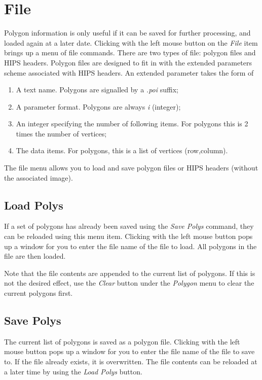 \section{File}
Polygon information is only useful if it can be saved for further processing, and loaded again at a later date. Clicking with the left mouse button on the {\it File\/} item brings up a menu of file commands. There are two types of file: polygon files and HIPS headers. Polygon files are designed to fit in with the extended parameters scheme associated with HIPS headers. An extended parameter takes the form of 
\begin{enumerate}
\item A text name. Polygons are signalled by a {\it .poi\/} suffix;
\item A parameter format. Polygons are always {\it i\/} (integer);
\item An integer specifying the number of following items. For polygons this is 2 times the number of vertices;
\item The data items. For polygons, this is a list of vertices (row,column).
\end{enumerate}
The file menu allows you to load and save polygon files or HIPS headers (without the associated image).

\subsection{Load Polys}
If a set of polygons has already been saved using the {\it Save Polys\/} command, they can be reloaded using this menu item. Clicking with the left mouse button pops up a window for you to enter the file name of the file to load. All polygons in the file are then loaded.

Note that the file contents are appended to the current list of polygons. If this is not the desired effect, use the {\it Clear\/} button under the {\it Polygon\/} menu to clear the current polygons first.

\subsection{Save Polys}
The current list of polygons is saved as a polygon file. Clicking with the left mouse button pops up a window for you to enter the file name of the file to save to. If the file already exists, it is overwritten. The file contents can be reloaded at a later time by using the {\it Load Polys\/} button.

